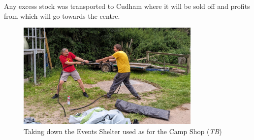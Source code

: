Any excess stock was transported to Cudham where it will be sold off and profits from which will go towards the centre.

\begin{figure}[ht]
    \centering
    \includegraphics[width=0.8\textwidth]{assets/disassembling-merch-stall.jpg}
    \caption{Taking down the Events Shelter used as for the Camp Shop (\textit{TB})}
\end{figure}